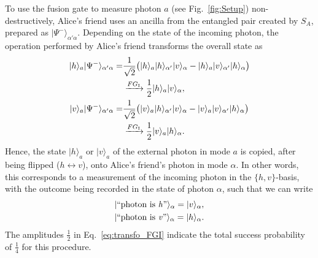 \documentclass[aps,floatfix,superscriptaddress,twocolumn,tightenlines,amsmath,amssymb,nofootinbib,10pt]{revtex4-1}
\newcommand{\ket}[1] {| #1 \rangle}
\begin{document}
To use the fusion gate to measure photon $a$ (see Fig.~\ref{fig:Setup}) non-destructively, Alice's friend uses an ancilla from the entangled pair created by $S_A$, prepared as $\ket{\Psi^-}_{\alpha'\alpha}$. Depending on the state of the incoming photon, the operation performed by Alice's friend transforms the overall state as
\begin{align}
\ket{h}_a\ket{\Psi^-}_{\alpha'\alpha} = & \frac{1}{\sqrt{2}} \big( \ket{h}_a\ket{h}_{\alpha'}\ket{v}_{\alpha} - \ket{h}_a\ket{v}_{\alpha'}\ket{h}_{\alpha} \big) \nonumber\\
&\xrightarrow{FG_\text{I}} \frac12 \ket{h}_a\ket{v}_{\alpha}, \notag \\
\ket{v}_a\ket{\Psi^-}_{\alpha'\alpha} = & \frac{1}{\sqrt{2}} \big( \ket{v}_a\ket{h}_{\alpha'}\ket{v}_{\alpha} - \ket{v}_a\ket{v}_{\alpha'}\ket{h}_{\alpha} \big) \nonumber \\
&\xrightarrow{FG_\text{I}} \frac12 \ket{v}_a\ket{h}_{\alpha}.
\label{eq:transfo_FGI}
\end{align}
Hence, the state $\ket{h}_a$ or $\ket{v}_a$ of the external photon in mode $a$ is copied, after being flipped ($h \leftrightarrow v$), onto Alice's friend's photon in mode $\alpha$. In other words, this corresponds to a measurement of the incoming photon in the $\{h,v\}$-basis, with the outcome being recorded in the state of photon $\alpha$, such that we can write
\begin{align}
&\ket{\text{``photon is \textit{h}''}}_\alpha = \ket{v}_\alpha , \nonumber\\
&\ket{\text{``photon is \textit{v}''}}_\alpha = \ket{h}_\alpha. \label{eq:memory_encoding}
\end{align}
The amplitudes $\frac12$ in Eq.~\eqref{eq:transfo_FGI} indicate the total success probability of $\frac14$ for this procedure.
\end{document}
